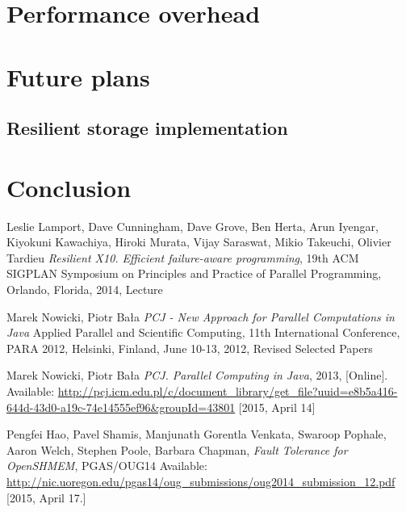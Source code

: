 \documentclass{llncs}
\begin{document}
\section{Performance overhead}

\section{Future plans}
\subsection{Resilient storage implementation}

\section{Conclusion}

\begin{thebibliography}{1}

Leslie Lamport, Dave Cunningham, Dave Grove, Ben Herta, Arun Iyengar, Kiyokuni Kawachiya, Hiroki Murata, Vijay Saraswat, Mikio Takeuchi, Olivier Tardieu
\emph{Resilient X10. Efficient failure-aware programming},
19th ACM SIGPLAN Symposium on Principles and Practice of Parallel Programming, Orlando, Florida, 2014, Lecture

Marek Nowicki, Piotr Bała
\emph{PCJ - New Approach for Parallel Computations in Java}
Applied Parallel and Scientific Computing, 11th International Conference, PARA 2012, Helsinki, Finland, June 10-13, 2012, Revised Selected Papers

Marek Nowicki, Piotr Bała
\emph{PCJ. Parallel Computing in Java}, 2013, [Online]. Available: \url{http://pcj.icm.edu.pl/c/document_library/get_file?uuid=e8b5a416-644d-43d0-a19c-74e14555ef96&groupId=43801} [2015, April 14]

Pengfei Hao, Pavel Shamis, Manjunath Gorentla Venkata, Swaroop Pophale, Aaron Welch, Stephen Poole, Barbara Chapman, \emph{Fault Tolerance for OpenSHMEM}, PGAS/OUG14
Available: \url{http://nic.uoregon.edu/pgas14/oug_submissions/oug2014_submission_12.pdf} [2015, April 17.]

\end{thebibliography}
\end{document}

